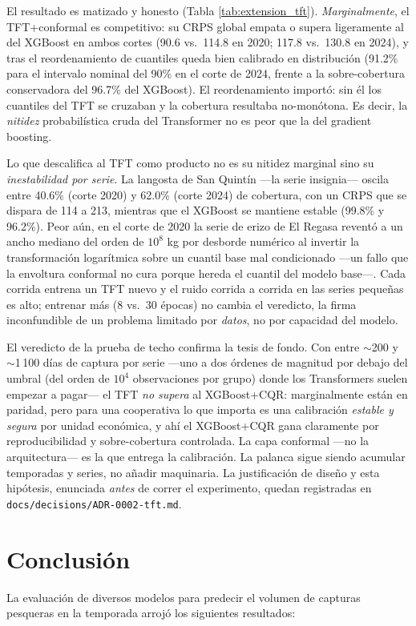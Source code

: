 \documentclass[twoside,11pt]{article}
\begin{document}
El resultado es matizado y honesto (Tabla \ref{tab:extension_tft}). \emph{Marginalmente}, el TFT+conformal es competitivo: su CRPS global empata o supera ligeramente al del XGBoost en ambos cortes (90.6 vs.\ 114.8 en 2020; 117.8 vs.\ 130.8 en 2024), y tras el reordenamiento de cuantiles queda bien calibrado en distribución (91.2\% para el intervalo nominal del 90\% en el corte de 2024, frente a la sobre-cobertura conservadora del 96.7\% del XGBoost). El reordenamiento importó: sin él los cuantiles del TFT se cruzaban y la cobertura resultaba no-monótona. Es decir, la \emph{nitidez} probabilística cruda del Transformer no es peor que la del gradient boosting.

Lo que descalifica al TFT como producto no es su nitidez marginal sino su \emph{inestabilidad por serie}. La langosta de San Quintín ---la serie insignia--- oscila entre 40.6\% (corte 2020) y 62.0\% (corte 2024) de cobertura, con un CRPS que se dispara de 114 a 213, mientras que el XGBoost se mantiene estable (99.8\% y 96.2\%). Peor aún, en el corte de 2020 la serie de erizo de El Regasa reventó a un ancho mediano del orden de $10^{8}$ kg por desborde numérico al invertir la transformación logarítmica sobre un cuantil base mal condicionado ---un fallo que la envoltura conformal no cura porque hereda el cuantil del modelo base---. Cada corrida entrena un TFT nuevo y el ruido corrida a corrida en las series pequeñas es alto; entrenar más (8 vs.\ 30 épocas) no cambia el veredicto, la firma inconfundible de un problema limitado por \emph{datos}, no por capacidad del modelo.

El veredicto de la prueba de techo confirma la tesis de fondo. Con entre $\sim$200 y $\sim$1\,100 días de captura por serie ---uno a dos órdenes de magnitud por debajo del umbral (del orden de $10^{4}$ observaciones por grupo) donde los Transformers suelen empezar a pagar--- el TFT \emph{no supera} al XGBoost+CQR: marginalmente están en paridad, pero para una cooperativa lo que importa es una calibración \emph{estable y segura} por unidad económica, y ahí el XGBoost+CQR gana claramente por reproducibilidad y sobre-cobertura controlada. La capa conformal ---no la arquitectura--- es la que entrega la calibración. La palanca sigue siendo acumular temporadas y series, no añadir maquinaria. La justificación de diseño y esta hipótesis, enunciada \emph{antes} de correr el experimento, quedan registradas en \texttt{docs/decisions/ADR-0002-tft.md}.

\section{Conclusión}
La evaluación de diversos modelos para predecir el volumen de capturas pesqueras en la temporada arrojó los siguientes resultados:
\end{document}
